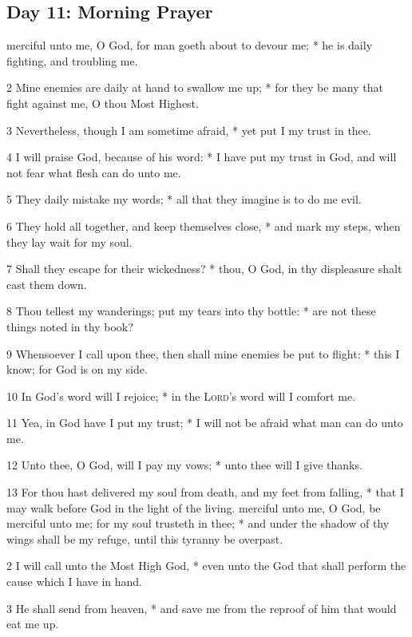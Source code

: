\subsection{Day 11: Morning Prayer}
 merciful unto me, O God, for man goeth about to devour me; * he is daily fighting, and troubling me.\par
2 Mine enemies are daily at hand to swallow me up; * for they be many that fight against me, O thou Most Highest.\par
3 Nevertheless, though I am sometime afraid, * yet put I my trust in thee.\par
4 I will praise God, because of his word: * I have put my trust in God, and will not fear what flesh can do unto me.\par
5 They daily mistake my words; * all that they imagine is to do me evil.\par
6 They hold all together, and keep themselves close, * and mark my steps, when they lay wait for my soul.\par
7 Shall they escape for their wickedness? * thou, O God, in thy displeasure shalt cast them down.\par
8 Thou tellest my wanderings; put my tears into thy bottle: * are not these things noted in thy book?\par
9 Whensoever I call upon thee, then shall mine enemies be put to flight: * this I know; for God is on my side.\par
10 In God's word will I rejoice; * in the {\textsc{Lord}}'s word will I comfort me.\par
11 Yea, in God have I put my trust; * I will not be afraid what man can do unto me.\par
12 Unto thee, O God, will I pay my vows; * unto thee will I give thanks.\par
13 For thou hast delivered my soul from death, and my feet from falling, * that I may walk before God in the light of the living.
 merciful unto me, O God, be merciful unto me; for my soul trusteth in thee; * and under the shadow of thy wings shall be my refuge, until this tyranny be overpast.\par
2 I will call unto the Most High God, * even unto the God that shall perform the cause which I have in hand.\par
3 He shall send from heaven, * and save me from the reproof of him that would eat me up.\par
